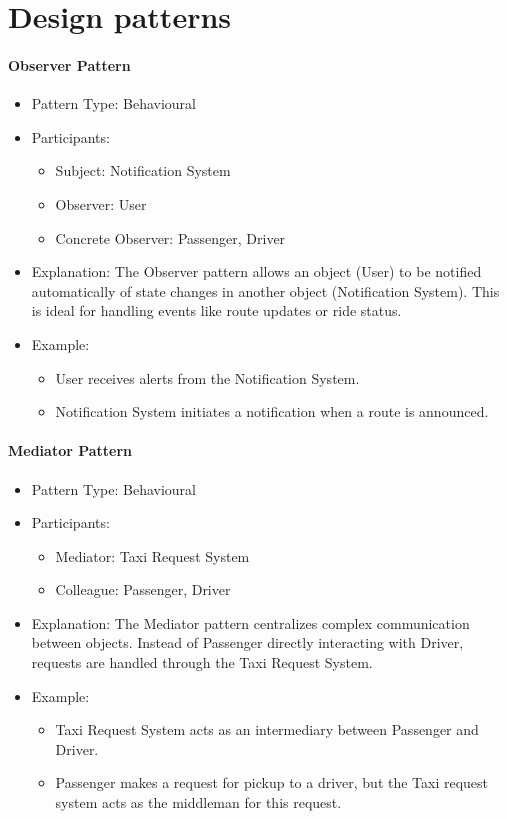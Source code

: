 \documentclass[12pt]{article}
\begin{document}
\section{Design patterns}

\paragraph{Observer Pattern}

\begin{itemize}
    \item Pattern Type: Behavioural
    \item Participants:
    \begin{itemize}
        \item Subject: Notification System
        \item Observer: User
        \item Concrete Observer: Passenger, Driver 
    \end{itemize}
    \item Explanation: The Observer pattern allows an object (User) to be notified automatically of state changes in another object (Notification System). This is ideal for handling events like route updates or ride status.
    \item Example:
    \begin{itemize}
        \item User receives alerts from the Notification System.
        \item Notification System initiates a notification when a route is announced.
    \end{itemize}
\end{itemize}

\paragraph{Mediator Pattern}

\begin{itemize}
    \item Pattern Type: Behavioural
    \item Participants:
    \begin{itemize}
        \item Mediator: Taxi Request System
        \item Colleague: Passenger, Driver
    \end{itemize}
    \item Explanation: The Mediator pattern centralizes complex communication between objects. Instead of Passenger directly interacting with Driver, requests are handled through the Taxi Request System.
    \item Example:
    \begin{itemize}
        \item Taxi Request System acts as an intermediary between Passenger and Driver.
        \item Passenger makes a request for pickup to a driver, but the Taxi request system acts as the middleman for this request.
    \end{itemize}
\end{itemize}
\end{document}
